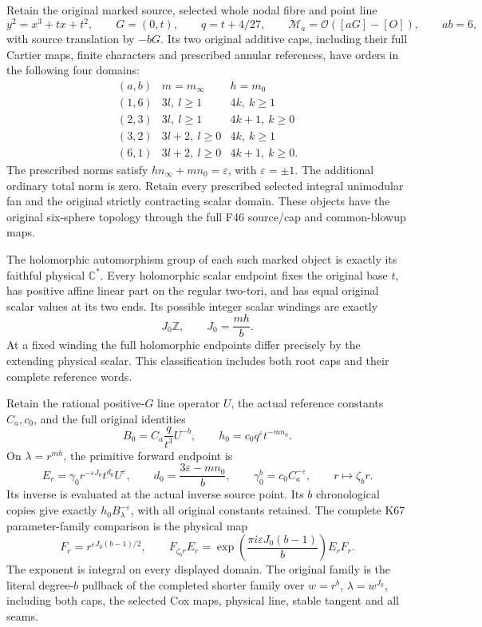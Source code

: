\begin{theorem}\label{night:P3K.118}
Retain the original marked source, selected whole nodal fibre and point line
\[
y^2=x^3+tx+t^2,\qquad G=(0,t),\qquad
q=t+4/27,\qquad \mathcal M_a=\mathcal O([aG]-[O]),\qquad ab=6,
\]
with source translation by \(-bG\). Its two original additive caps,
including their full Cartier maps, finite characters and prescribed
annular references, have orders in the following four domains:
\[
\begin{array}{c|c|c}
(a,b)&m=m_\infty&h=m_0\\ \hline
(1,6)&3l,\ l\ge1&4k,\ k\ge1\\
(2,3)&3l,\ l\ge1&4k+1,\ k\ge0\\
(3,2)&3l+2,\ l\ge0&4k,\ k\ge1\\
(6,1)&3l+2,\ l\ge0&4k+1,\ k\ge0.
\end{array}
\]
The prescribed norms satisfy \(hn_\infty+mn_0=\varepsilon\), with
\(\varepsilon=\pm1\). The additional ordinary total norm is zero.
Retain every prescribed selected integral unimodular fan and the
original strictly contracting scalar domain. These objects have the
original six-sphere topology through the full F46 source/cap and
common-blowup maps.

The holomorphic automorphism group of each such marked object is
exactly its faithful physical \(\mathbb C^*\). Every holomorphic
scalar endpoint fixes the original base \(t\), has positive affine
linear part on the regular two-tori, and has equal original scalar
values at its two ends. Its possible integer scalar windings are
exactly
\[
J_0\mathbb Z,\qquad J_0=\frac{mh}{b}.
\]
At a fixed winding the full holomorphic endpoints differ precisely
by the extending physical scalar. This classification includes both
root caps and their complete reference words.

Retain the rational positive-\(G\) line operator \(U\), the actual
reference constants \(C_a,c_0\), and the full original identities
\[
B_0=C_a\frac q{t^3}U^{-b},\qquad
h_0=c_0q^\varepsilon t^{-mn_0}.
\]
On \(\lambda=r^{mh}\), the primitive forward endpoint is
\[
E_r=\gamma_0r^{-\varepsilon J_0}t^{d_0}U^\varepsilon,
\qquad
d_0=\frac{3\varepsilon-mn_0}{b},\qquad
\gamma_0^b=c_0C_a^{-\varepsilon},
\qquad r\longmapsto\zeta_b r.
\]
Its inverse is evaluated at the actual inverse source point. Its
\(b\) chronological copies give exactly
\(h_0B_\lambda^{-\varepsilon}\), with all original constants retained.
The complete K67 parameter-family comparison is the physical map
\[
F_r=r^{\varepsilon J_0(b-1)/2},\qquad
F_{\zeta_b r}E_r=
\exp\!\left(\frac{\pi i\varepsilon J_0(b-1)}b\right)E_rF_r.
\]
The exponent is integral on every displayed domain. The original
family is the literal degree-\(b\) pullback of the completed shorter
family over \(w=r^b\), \(\lambda=w^{J_0}\), including both caps,
the selected Cox maps, physical line, stable tangent and all seams.


\end{theorem}
